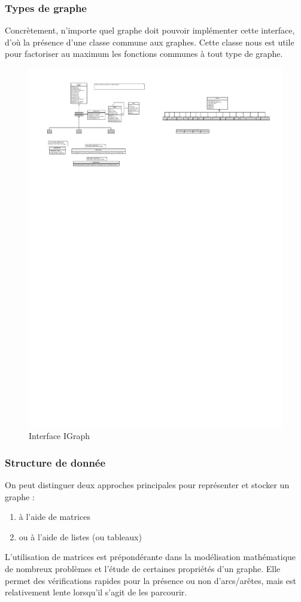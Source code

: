 \documentclass[french]{article}
\begin{document}
			\subsubsection{Types de graphe}
			Concrètement, n'importe quel graphe doit pouvoir implémenter cette interface, d'où la présence d'une classe commune aux graphes. Cette classe nous est utile pour factoriser au maximum les fonctions communes à tout type de graphe.
			\begin{figure}[H]
				\centering
				\includegraphics[scale=3.0]{Conception/igraph.pdf}
				\caption{Interface IGraph}
			\end{figure}
			
			\subsubsection{Structure de donnée}
			On peut distinguer deux approches principales pour représenter et stocker un graphe :
			\begin{enumerate}
				\item à l'aide de matrices
				\item ou à l'aide de listes (ou tableaux)
			\end{enumerate}	
			L'utilisation de matrices est prépondérante dans la modélisation mathématique de nombreux problèmes et l'étude de certaines propriétés d'un graphe. Elle permet des vérifications rapides pour la présence ou non d'arcs/arêtes, mais est relativement lente lorsqu'il s'agit de les parcourir.
			
\end{document}
